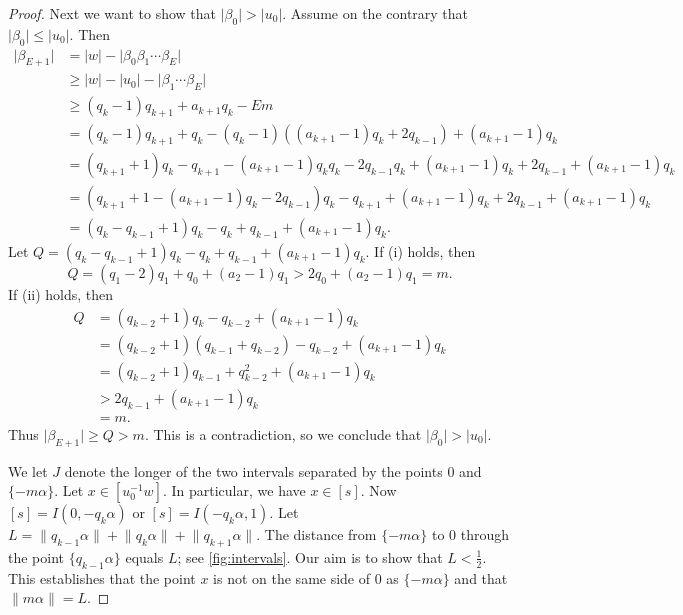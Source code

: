 \documentclass[a4paper,fleqn]{article}
\providecommand{\abs}[1]{\lvert#1\rvert}
\providecommand{\norm}[1]{\lVert#1\rVert}
\begin{document}
\begin{proof}
    Next we want to show that $\abs{\beta_0} > \abs{u_0}$. Assume on the contrary that $\abs{\beta_0} \leq \abs{u_0}$.
    Then
    \begin{align*}
      \abs{\beta_{E+1}} &= \abs{w} - \abs{\beta_0 \beta_1 \dotsm \beta_E} \\
                        &\geq \abs{w} - \abs{u_0} - \abs{\beta_1 \dotsm \beta_E} \\
                        &\geq (q_k - 1)q_{k+1} + a_{k+1}q_k - Em \\
                        &= (q_k - 1)q_{k+1} + q_k - (q_k - 1)((a_{k+1} - 1)q_k + 2q_{k-1}) + (a_{k+1} - 1)q_k \\
                        &= (q_{k+1} + 1)q_k - q_{k+1} - (a_{k+1} - 1)q_k q_k - 2q_{k-1}q_k + (a_{k+1} - 1)q_k + 2q_{k-1} + (a_{k+1} - 1)q_k \\
                        &= (q_{k+1} + 1 - (a_{k+1} - 1)q_k - 2q_{k-1})q_k - q_{k+1} + (a_{k+1} - 1)q_k + 2q_{k-1} + (a_{k+1} - 1)q_k \\
                        &= (q_k - q_{k-1} + 1)q_k - q_k + q_{k-1} + (a_{k+1} - 1)q_k.
    \end{align*}
    Let $Q = (q_k - q_{k-1} + 1)q_k - q_k + q_{k-1} + (a_{k+1} - 1)q_k$. If (i) holds, then
    \begin{equation*}
      Q = (q_1 - 2)q_1 + q_0 + (a_2 - 1)q_1 > 2q_0 + (a_2 - 1)q_1 = m.
    \end{equation*}
    If (ii) holds, then
    \begin{align*}
      Q &= (q_{k-2} + 1)q_k - q_{k-2} + (a_{k+1} - 1)q_k \\
        &= (q_{k-2} + 1)(q_{k-1} + q_{k-2}) - q_{k-2} + (a_{k+1} - 1)q_k \\
        &= (q_{k-2} + 1)q_{k-1} + q_{k-2}^2 + (a_{k+1} - 1)q_k \\
        &> 2q_{k-1} + (a_{k+1} - 1)q_k \\
        &= m.
    \end{align*}
    Thus $\abs{\beta_{E+1}} \geq Q > m$. This is a contradiction, so we conclude that $\abs{\beta_0} > \abs{u_0}$.

    We let $J$ denote the longer of the two intervals separated by the points $0$ and $\{-m\alpha\}$. Let
    $x \in [u_0^{-1} w]$. In particular, we have $x \in [s]$. Now $[s] = I(0, -q_k\alpha)$ or $[s] = I(-q_k\alpha, 1)$.
    Let $L = \norm{q_{k-1}\alpha} + \norm{q_k\alpha} + \norm{q_{k+1}\alpha}$. The distance from $\{-m\alpha\}$ to $0$
    through the point $\{q_{k-1}\alpha\}$ equals $L$; see \autoref{fig:intervals}. Our aim is to show that
    $L < \tfrac12$. This establishes that the point $x$ is not on the same side of $0$ as $\{-m\alpha\}$ and that
    $\norm{m\alpha} = L$.
    

\end{proof}
\end{document}
